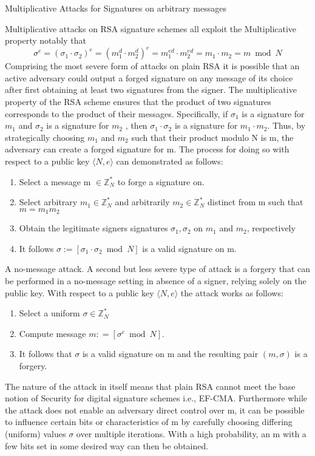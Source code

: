 \documentclass[]{final_report}
\theoremstyle{definition}
\begin{document}
Multiplicative Attacks for Signatures on arbitrary messages

Multiplicative attacks on RSA signature schemes all exploit the Multiplicative property notably that
\begin{equation}
\sigma^e = (\sigma_{1} \cdot \sigma_{2})^e = (m_{1}^d \cdot m_{2}^d)^e = m_{1}^{ed} \cdot m_{2}^{ed} = m_{1} \cdot m_{2} = m \bmod N 
\end{equation}
Comprising the most severe form of attacks on plain RSA it is possible that an active adversary could output a forged signature on any message of its choice after first obtaining at least two signatures from the signer.
The multiplicative property of the RSA scheme ensures that the product of two signatures corresponds to the product of their messages. Specifically, if $\sigma_{1}$ is a signature for $m_{1}$ and $\sigma_{2}$ is a signature for $m_{2}$ , then $\sigma_{1} \cdot \sigma_{2}$ is a signature for $m_{1} \cdot m_{2}$. Thus, by strategically choosing $m_{1}$ and $m_{2}$ such that their product modulo N is m, the adversary can create a forged signature for m.
The process for doing so with respect to a public key $\langle N, e \rangle$ can demonstrated as follows:
\begin{enumerate}
    \item Select a message m $\in \mathbb{Z}^*_{N}$ to forge a signature on.
    \item Select arbitrary $m_{1} \in \mathbb{Z}^*_{N}$ and arbitrarily $m_{2} \in \mathbb{Z}^*_{N}$ distinct from m such that $m = m_{1} m_{2}$ 
    \item Obtain the legitimate signers signatures $\sigma_{1}, \sigma_{2}$ on $m_{1}$ and $m_{2}$, respectively
    \item It follows $\sigma := [\sigma_{1} \cdot \sigma_{2}  \bmod N ]$ is a valid signature on m.
\end{enumerate}

A no-message attack.
A second but less severe type of attack is a forgery that can be performed in a no-message setting in absence of a signer, relying solely on the public key. With respect to a public key $\langle N, e \rangle$ the attack works as follows:
\begin{enumerate}
    \item Select a uniform $\sigma \in \mathbb{Z}^*_{N}$
    \item Compute message $m : = [\sigma^e \bmod N]$.
    \item It follows that $\sigma$ is a valid signature on m and the resulting pair $(m, \sigma)$ is a forgery.
\end{enumerate}
The nature of the attack in itself means that plain RSA cannot meet the base notion of Security for digital signature schemes i.e., EF-CMA. Furthermore while the attack does not enable an adversary direct control over m, it can be possible to influence certain bits or characteristics of m by carefully choosing differing (uniform) values $\sigma$ over multiple iterations. With a high probability,  an m with a few bits set in some desired way can then be obtained.
\end{document}
